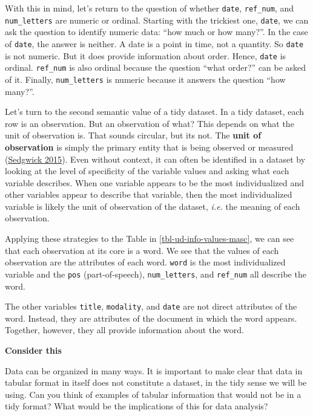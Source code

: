 \documentclass[
  letterpaper,
  DIV=11,
  numbers=noendperiod]{scrreport}
\theoremstyle{definition}
\theoremstyle{remark}
\begin{document}
With this in mind, let's return to the question of whether
\texttt{date}, \texttt{ref\_num}, and \texttt{num\_letters} are numeric
or ordinal. Starting with the trickiest one, \texttt{date}, we can ask
the question to identify numeric data: ``how much or how many?''. In the
case of \texttt{date}, the answer is neither. A date is a point in time,
not a quantity. So \texttt{date} is not numeric. But it does provide
information about order. Hence, \texttt{date} is ordinal.
\texttt{ref\_num} is also ordinal because the question ``what order?''
can be asked of it. Finally, \texttt{num\_letters} is numeric because it
answers the question ``how many?''.

Let's turn to the second semantic value of a tidy dataset. In a tidy
dataset, each row is an observation. But an observation of what? This
depends on what the unit of observation is. That sounds circular, but
its not. The \textbf{unit of observation} is simply the primary entity
that is being observed or measured
(\protect\hyperlink{ref-Sedgwick2015}{Sedgwick 2015}). Even without
context, it can often be identified in a dataset by looking at the level
of specificity of the variable values and asking what each variable
describes. When one variable appears to be the most individualized and
other variables appear to describe that variable, then the most
individualized variable is likely the unit of observation of the
dataset, \emph{i.e.} the meaning of each observation.

Applying these strategies to the Table in \ref{tbl-ud-info-values-masc},
we can see that each observation at its core is a word. We see that the
values of each observation are the attributes of each word.
\texttt{word} is the most individualized variable and the \texttt{pos}
(part-of-speech), \texttt{num\_letters}, and \texttt{ref\_num} all
describe the word.

The other variables \texttt{title}, \texttt{modality}, and \texttt{date}
are not direct attributes of the word. Instead, they are attributes of
the document in which the word appears. Together, however, they all
provide information about the word.

\begin{tcolorbox}[enhanced jigsaw, breakable, colback=white, rightrule=.15mm, arc=.35mm, left=2mm, toprule=.15mm, leftrule=.75mm, bottomrule=.15mm, opacityback=0]

\textbf{ Consider this}

Data can be organized in many ways. It is important to make clear that
data in tabular format in itself does not constitute a dataset, in the
tidy sense we will be using. Can you think of examples of tabular
information that would not be in a tidy format? What would be the
implications of this for data analysis?

\end{tcolorbox}
\end{document}

